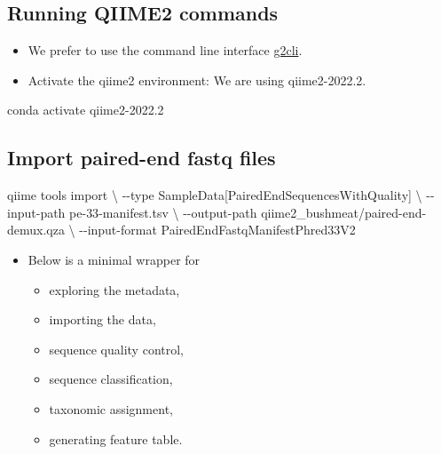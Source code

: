 \documentclass[
  12pt,
  openany]{book}
\newenvironment{Shaded}{\begin{snugshade}}{\end{snugshade}}
\newcommand{\AttributeTok}[1]{\textcolor[rgb]{0.77,0.63,0.00}{#1}}
\newcommand{\DataTypeTok}[1]{\textcolor[rgb]{0.13,0.29,0.53}{#1}}
\newcommand{\ExtensionTok}[1]{#1}
\newcommand{\NormalTok}[1]{#1}
\newcommand{\StringTok}[1]{\textcolor[rgb]{0.31,0.60,0.02}{#1}}
\providecommand{\tightlist}{%
  \setlength{\itemsep}{0pt}\setlength{\parskip}{0pt}}
\begin{document}
\hypertarget{running-qiime2-commands}{%
\subsection{Running QIIME2 commands}\label{running-qiime2-commands}}

\begin{itemize}
\tightlist
\item
  We prefer to use the command line interface \href{https://docs.qiime2.org/2022.2/interfaces/q2cli/}{g2cli}.
\item
  Activate the qiime2 environment: We are using qiime2-2022.2.
\end{itemize}

\begin{Shaded}
\begin{Highlighting}[]
\ExtensionTok{conda}\NormalTok{ activate qiime2{-}2022.2}
\end{Highlighting}
\end{Shaded}

\hypertarget{import-paired-end-fastq-files}{%
\subsection{Import paired-end fastq files}\label{import-paired-end-fastq-files}}

\begin{Shaded}
\begin{Highlighting}[]
\ExtensionTok{qiime}\NormalTok{ tools import }\DataTypeTok{\textbackslash{}}
  \AttributeTok{{-}{-}type} \StringTok{\textquotesingle{}SampleData[PairedEndSequencesWithQuality]\textquotesingle{}} \DataTypeTok{\textbackslash{}}
  \AttributeTok{{-}{-}input{-}path}\NormalTok{ pe{-}33{-}manifest.tsv }\DataTypeTok{\textbackslash{}}
  \AttributeTok{{-}{-}output{-}path}\NormalTok{ qiime2\_bushmeat/paired{-}end{-}demux.qza }\DataTypeTok{\textbackslash{}}
  \AttributeTok{{-}{-}input{-}format}\NormalTok{ PairedEndFastqManifestPhred33V2}
\end{Highlighting}
\end{Shaded}

\begin{itemize}
\tightlist
\item
  Below is a minimal wrapper for

  \begin{itemize}
  \tightlist
  \item
    exploring the metadata,
  \item
    importing the data,
  \item
    sequence quality control,
  \item
    sequence classification,
  \item
    taxonomic assignment,
  \item
    generating feature table.
  \end{itemize}
\end{itemize}
\end{document}
